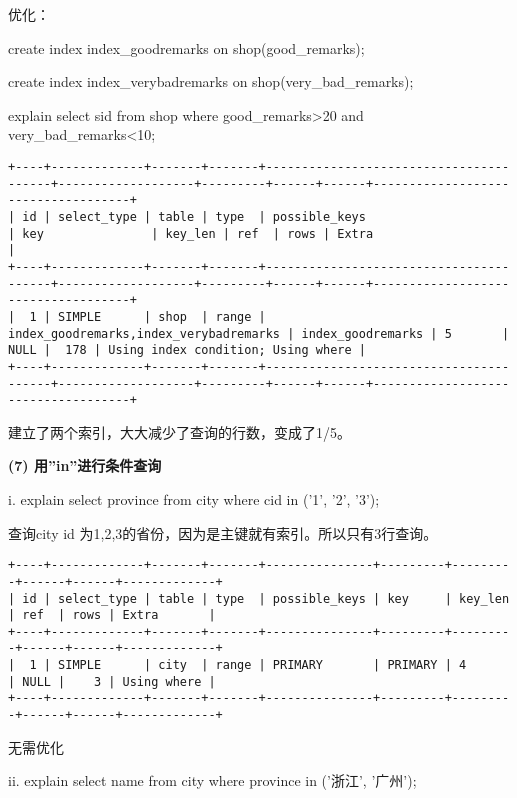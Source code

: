 \documentclass[a4paper, 11pt, nofonts, nocap, fancyhdr]{ctexart}
\begin{document}
优化：

create index index\_goodremarks on shop(good\_remarks);

create index index\_verybadremarks on shop(very\_bad\_remarks);

explain select sid from shop where good\_remarks>20 and very\_bad\_remarks<10;

\begin{verbatim}
+----+-------------+-------+-------+----------------------------------------+-------------------+---------+------+------+------------------------------------+
| id | select_type | table | type  | possible_keys                          | key               | key_len | ref  | rows | Extra                              |
+----+-------------+-------+-------+----------------------------------------+-------------------+---------+------+------+------------------------------------+
|  1 | SIMPLE      | shop  | range | index_goodremarks,index_verybadremarks | index_goodremarks | 5       | NULL |  178 | Using index condition; Using where |
+----+-------------+-------+-------+----------------------------------------+-------------------+---------+------+------+------------------------------------+
\end{verbatim}

建立了两个索引，大大减少了查询的行数，变成了1/5。

\vspace{0.7cm}

\textbf{(7) 用”in”进行条件查询} 

i. explain select province from city where cid in ('1', '2', '3');

查询city id 为1,2,3的省份，因为是主键就有索引。所以只有3行查询。

\begin{verbatim}
+----+-------------+-------+-------+---------------+---------+---------+------+------+-------------+
| id | select_type | table | type  | possible_keys | key     | key_len | ref  | rows | Extra       |
+----+-------------+-------+-------+---------------+---------+---------+------+------+-------------+
|  1 | SIMPLE      | city  | range | PRIMARY       | PRIMARY | 4       | NULL |    3 | Using where |
+----+-------------+-------+-------+---------------+---------+---------+------+------+-------------+
\end{verbatim}

无需优化

ii. explain select name from city where province in ('浙江', '广州');
\end{document}
